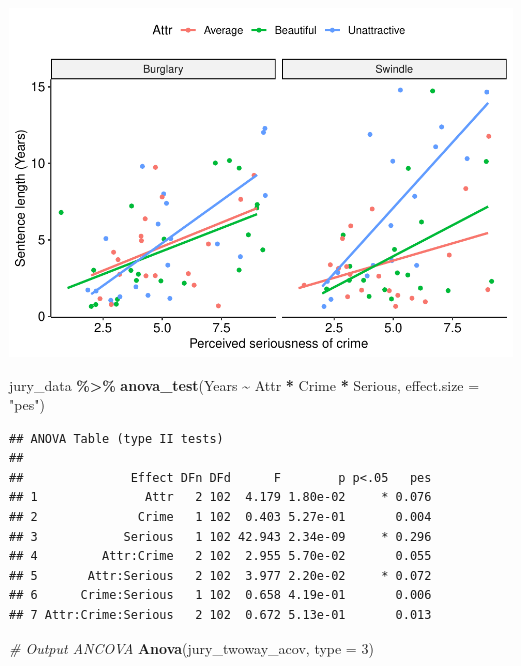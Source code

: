\documentclass[
]{book}
\newenvironment{Shaded}{\begin{snugshade}}{\end{snugshade}}
\newcommand{\AttributeTok}[1]{\textcolor[rgb]{0.13,0.29,0.53}{#1}}
\newcommand{\CommentTok}[1]{\textcolor[rgb]{0.56,0.35,0.01}{\textit{#1}}}
\newcommand{\DecValTok}[1]{\textcolor[rgb]{0.00,0.00,0.81}{#1}}
\newcommand{\FunctionTok}[1]{\textcolor[rgb]{0.13,0.29,0.53}{\textbf{#1}}}
\newcommand{\NormalTok}[1]{#1}
\newcommand{\SpecialCharTok}[1]{\textcolor[rgb]{0.81,0.36,0.00}{\textbf{#1}}}
\newcommand{\StringTok}[1]{\textcolor[rgb]{0.31,0.60,0.02}{#1}}
\begin{document}
\includegraphics{_main_files/figure-latex/unnamed-chunk-286-1.pdf}

\begin{Shaded}
\begin{Highlighting}[]
\NormalTok{jury\_data }\SpecialCharTok{\%\textgreater{}\%}
  \FunctionTok{anova\_test}\NormalTok{(Years }\SpecialCharTok{\textasciitilde{}}\NormalTok{ Attr }\SpecialCharTok{*}\NormalTok{ Crime }\SpecialCharTok{*}\NormalTok{ Serious, }\AttributeTok{effect.size =} \StringTok{"pes"}\NormalTok{)}
\end{Highlighting}
\end{Shaded}

\begin{verbatim}
## ANOVA Table (type II tests)
## 
##               Effect DFn DFd      F        p p<.05   pes
## 1               Attr   2 102  4.179 1.80e-02     * 0.076
## 2              Crime   1 102  0.403 5.27e-01       0.004
## 3            Serious   1 102 42.943 2.34e-09     * 0.296
## 4         Attr:Crime   2 102  2.955 5.70e-02       0.055
## 5       Attr:Serious   2 102  3.977 2.20e-02     * 0.072
## 6      Crime:Serious   1 102  0.658 4.19e-01       0.006
## 7 Attr:Crime:Serious   2 102  0.672 5.13e-01       0.013
\end{verbatim}

\begin{Shaded}
\begin{Highlighting}[]
\CommentTok{\# Output ANCOVA}
\FunctionTok{Anova}\NormalTok{(jury\_twoway\_acov, }\AttributeTok{type =} \DecValTok{3}\NormalTok{)}
\end{Highlighting}
\end{Shaded}
\end{document}
